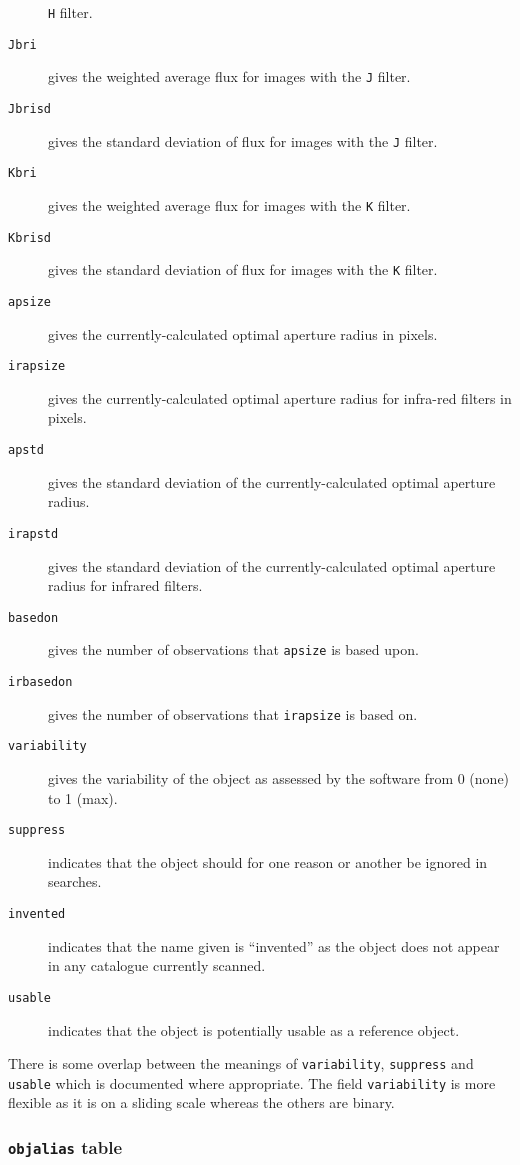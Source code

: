 \begin{description}
\texttt{H} filter.
\item[\tt Jbri] gives the weighted average flux for images with the \texttt{J}
filter.
\item[\tt Jbrisd] gives the standard deviation of flux for images with the
\texttt{J} filter.
\item[\tt Kbri] gives the weighted average flux for images with the \texttt{K}
filter.
\item[\tt Kbrisd] gives the standard deviation of flux for images with the
\texttt{K} filter.
\item[\tt apsize] gives the currently-calculated optimal aperture radius in
pixels.
\item[\tt irapsize] gives the currently-calculated optimal aperture radius for
infra-red filters in pixels.
\item[\tt apstd] gives the standard deviation of the currently-calculated
optimal aperture radius.
\item[\tt irapstd] gives the standard deviation of the currently-calculated
optimal aperture radius for infrared filters.
\item[\tt basedon] gives the number of observations that \texttt{apsize} is
based upon.
\item[\tt irbasedon] gives the number of observations that \texttt{irapsize} is
based on.
\item[\tt variability] gives the variability of the object as assessed by the
software from 0 (none) to 1 (max).
\item[\tt suppress] indicates that the object should for one reason or another
be ignored in searches.
\item[\tt invented] indicates that the name given is ``invented'' as the object
does not appear in any catalogue currently scanned.
\item[\tt usable] indicates that the object is potentially usable as a reference
object.
\end{description}

There is some overlap between the meanings of \texttt{variability},
\texttt{suppress} and \texttt{usable} which is documented where appropriate. The
field \texttt{variability} is more flexible as it is on a sliding scale whereas
the others are binary.

\subsubsection{\texttt{objalias} table}
\protect\label{section:objalias}


